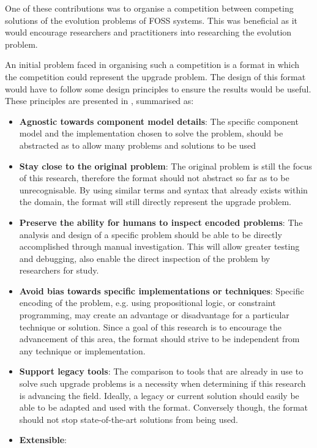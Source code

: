 One of these contributions was to organise a competition between competing solutions of the evolution problems of FOSS systems.
This was beneficial as it would encourage researchers and practitioners into researching the evolution problem.

An initial problem faced in organising such a competition is a format in which the competition could represent the upgrade problem.
The design of this format would have to follow some design principles to ensure the results would be useful.
These principles are presented in \citep{treinen2009common}, summarised as:

\begin{itemize}
  \item \textbf{Agnostic towards component model details}: 
  The specific component model and the implementation chosen to solve the problem, should be abstracted as to allow many problems and solutions to be used  
  \item \textbf{Stay close to the original problem}: 
  The original problem is still the focus of this research, therefore the format should not abstract so far as to be unrecognisable. 
  By using similar terms and syntax that already exists within the domain, the format will still directly represent the upgrade problem. 
  \item \textbf{Preserve the ability for humans to inspect encoded problems}:
  The analysis and design of a specific problem should be able to be directly accomplished through manual investigation.
  This will allow greater testing and debugging, also enable the direct inspection of the problem by researchers for study.
  \item \textbf{Avoid bias towards specific implementations or techniques}:
  Specific encoding of the problem, e.g. using propositional logic, or constraint programming, may create an advantage or disadvantage for a particular technique or solution.
  Since a goal of this research is to encourage the advancement of this area, the format should strive to be independent from any technique or implementation. 
  \item \textbf{Support legacy tools}:
  The comparison to tools that are already in use to solve such upgrade problems is a necessity when determining if this research is advancing the field.
  Ideally, a legacy or current solution should easily be able to be adapted and used with the format.
  Conversely though, the format should not stop state-of-the-art solutions from being used.
  \item \textbf{Extensible}:

\end{itemize}
